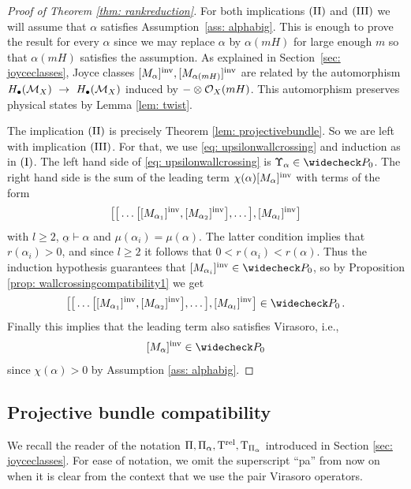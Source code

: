 \documentclass[a4paper, 12pt]{amsart}
\begin{document}
\begin{proof}[Proof of Theorem \ref{thm: rankreduction}]
For both implications $(\textup{II})$ and $(\textup{III})$ we will assume that $\alpha$ satisfies Assumption~\ref{ass: alphabig}. This is enough to prove the result for every $\alpha$ since we may replace $\alpha$ by $\alpha(mH)$ for large enough $m$ so that $\alpha(mH)$ satisfies the assumption. As explained in Section~\ref{sec: joyceclasses}, Joyce classes $[M_\alpha]^{\mathrm{inv}}, [M_{\alpha(mH)}]^{\mathrm{inv}}$ are related by the automorphism $H_\bullet({\mathcal M}_X)~\to~H_\bullet({\mathcal M}_X)$ induced by $-\otimes {\mathcal O}_X(mH)$. This automorphism preserves physical states by Lemma \ref{lem: twist}. 

The implication $(\textup{II})$ is precisely Theorem \ref{lem: projectivebundle}. So we are left with implication $(\textup{III})$. For that, we use \eqref{eq: upsilonwallcrossing} and induction as in $(\textup{I})$. The left hand side of \eqref{eq: upsilonwallcrossing} is $\Upsilon_\alpha\in \widecheck P_0$. The right hand side is the sum of the leading term $\chi(\alpha)[M_\alpha]^{\mathrm{inv}}$ with terms of the form
\[\big[\big[\ldots  \big[ [M_{\alpha_1}]^{\mathrm{inv}},[M_{\alpha_2}]^{\mathrm{inv}} \big],\ldots \big ],[M_{\alpha_l}]^{\mathrm{inv}} \big]\]
with $l\geq 2$, $\underline{\alpha}\vdash \alpha$ and $\mu(\alpha_i)=\mu(\alpha)$. The latter condition implies that $r(\alpha_i)>0$, and since $l\geq 2$ it follows that $0<r(\alpha_i)<r(\alpha)$. Thus the induction hypothesis guarantees that $[M_{\alpha_i}]^\inva\in \widecheck P_0$, so by Proposition \ref{prop: wallcrossingcompatibility1} we get 
\[\big[\big[\ldots  \big[ [M_{\alpha_1}]^\inva,[M_{\alpha_2}]^\inva \big],\ldots \big ],[M_{\alpha_l}]^\inva \big]\in \widecheck P_0\,.\]
Finally this implies that the leading term also satisfies Virasoro, i.e., \[[M_\alpha]^\inva\in \widecheck P_0\]
since $\chi(\alpha)>0$ by Assumption \ref{ass: alphabig}. \qedhere
\end{proof}



\subsection{Projective bundle compatibility}
 We recall the reader of the notation $\Pi, \Pi_\alpha, \mathrm{T}^{\rm rel}, \mathrm{T}_{\Pi_\alpha}$ introduced in Section \ref{sec: joyceclasses}. For ease of notation, we omit the superscript ``pa'' from now on when it is clear from the context that we use the pair Virasoro operators.


\end{document}
